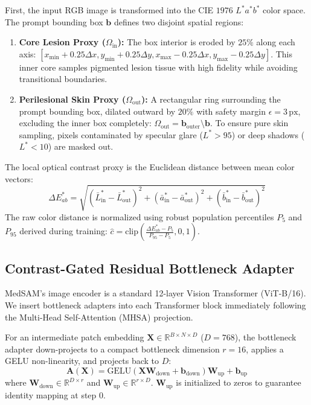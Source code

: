 \documentclass[runningheads]{llncs}
\begin{document}
First, the input RGB image is transformed into the CIE $1976$ $L^*a^*b^*$ color space. The prompt bounding box $\mathbf{b}$ defines two disjoint spatial regions:
\begin{enumerate}
    \item \textbf{Core Lesion Proxy ($\Omega_{\text{in}}$):} The box interior is eroded by $25\%$ along each axis: $[x_{\min} + 0.25\Delta x, y_{\min} + 0.25\Delta y, x_{\max} - 0.25\Delta x, y_{\max} - 0.25\Delta y]$. This inner core samples pigmented lesion tissue with high fidelity while avoiding transitional boundaries.
    \item \textbf{Perilesional Skin Proxy ($\Omega_{\text{out}}$):} A rectangular ring surrounding the prompt bounding box, dilated outward by $20\%$ with safety margin $\epsilon = 3\,\text{px}$, excluding the inner box completely: $\Omega_{\text{out}} = \mathbf{b}_{\text{outer}} \setminus \mathbf{b}$. To ensure pure skin sampling, pixels contaminated by specular glare ($L^* > 95$) or deep shadows ($L^* < 10$) are masked out.
\end{enumerate}

The local optical contrast proxy is the Euclidean distance between mean color vectors:
\begin{equation}
\Delta E^*_{ab} = \sqrt{(\bar{L}^*_{\text{in}} - \bar{L}^*_{\text{out}})^2 + (\bar{a}^*_{\text{in}} - \bar{a}^*_{\text{out}})^2 + (\bar{b}^*_{\text{in}} - \bar{b}^*_{\text{out}})^2}
\end{equation}
The raw color distance is normalized using robust population percentiles $P_5$ and $P_{95}$ derived during training: $\hat{c} = \text{clip}\left(\frac{\Delta E^*_{ab} - P_5}{P_{95} - P_5}, 0, 1\right)$.

\subsection{Contrast-Gated Residual Bottleneck Adapter}
MedSAM's image encoder is a standard 12-layer Vision Transformer (ViT-B/16). We insert bottleneck adapters into each Transformer block immediately following the Multi-Head Self-Attention (MHSA) projection.

For an intermediate patch embedding $\mathbf{X} \in \mathbb{R}^{B \times N \times D}$ ($D = 768$), the bottleneck adapter down-projects to a compact bottleneck dimension $r = 16$, applies a GELU non-linearity, and projects back to $D$:
\begin{equation}
\mathbf{A}(\mathbf{X}) = \text{GELU}(\mathbf{X} \mathbf{W}_{\text{down}} + \mathbf{b}_{\text{down}}) \mathbf{W}_{\text{up}} + \mathbf{b}_{\text{up}}
\end{equation}
where $\mathbf{W}_{\text{down}} \in \mathbb{R}^{D \times r}$ and $\mathbf{W}_{\text{up}} \in \mathbb{R}^{r \times D}$. $\mathbf{W}_{\text{up}}$ is initialized to zeros to guarantee identity mapping at step $0$.
\end{document}
